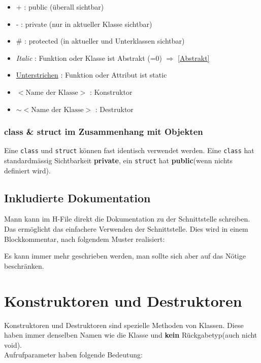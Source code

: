 \begin{itemize}[itemsep=1pt, parsep=0pt]
    \item + : public (überall sichtbar)
    \item - : private (nur in  aktueller Klasse sichtbar)
    \item \# : protected (in aktueller und Unterklassen sichtbar)
    \item \textit{Italic} : Funktion oder Klasse ist Abstrakt (=0) $\Rightarrow$ \ref{Abstrakt}
    \item \underline{Unterstrichen} : Funktion oder Attribut ist static
    \item $<\text{Name der Klasse}>$ :  Konstruktor
    \item $\sim<\text{Name der Klasse}>$ : Destruktor
\end{itemize}



\subsubsection{class \& struct im Zusammenhang mit Objekten}

Eine \verb|class| und \verb|struct| können fast identisch verwendet werden. 
Eine \verb|class| hat standardmässig Sichtbarkeit \textbf{private}, ein \verb|struct| hat \textbf{public}(wenn nichts definiert wird).

\subsection{Inkludierte Dokumentation}

Mann kann im H-File direkt die Dokumentation zu der Schnittstelle schreiben. 
Das ermöglicht das einfachere Verwenden der Schnittstelle.
Dies wird in einem Blockkommentar, nach folgendem Muster realisiert:



Es kann immer mehr geschrieben werden, man sollte sich aber auf das Nötige beschränken.

\section{Konstruktoren und Destruktoren}

Konstruktoren und Destruktoren sind spezielle Methoden von Klassen. 
Diese haben immer denselben Namen wie die Klasse und \textbf{kein} Rückgabetyp(auch nicht void).\\
Aufrufparameter haben folgende Bedeutung:

